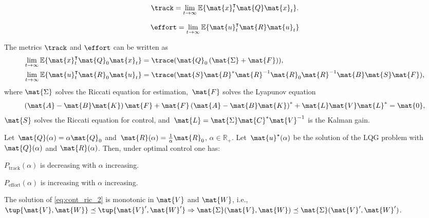 {\begin{forslides}
\begin{equation*}
\label{eq:ptrack}
\track=\lim_{t\to \infty}\mathbb{E}\{\mat{x}_t^\intercal \mat{Q}\mat{x}_t\}.
\end{equation*}

\begin{equation*}
\label{eq:peffort}
\effort=\lim_{t\to \infty}\mathbb{E}\{\mat{u}_t^\intercal \mat{R} \mat{u}_t \}
\end{equation*}


\begin{lemma}
\label{lem:precision}
The metrics $\track$ and $\effort$ can be written as
\begin{equation*}
\begin{aligned}
    \lim_{t\to \infty}\mathbb{E}\{ \mat{x}_t^\intercal \mat{Q}_0\mat{x}_t\}&=\trace(\mat{Q}_0\left( \mat{\Sigma} +\mat{F}\right)), \\
    \lim_{t\to \infty}\mathbb{E}\{ \mat{u}_t^\intercal \mat{R}_0\mat{u}_t\}&=\trace(\mat{S}\mat{B}^*\mat{R}^{-1}\mat{R}_0\mat{R}^{-1}\mat{B}\mat{S}\mat{F}),
\end{aligned}
\end{equation*}
where 
$\mat{\Sigma}$ solves the Riccati equation for estimation,~$\mat{F}$ solves the Lyapunov equation
\begin{equation}
\label{eq:lyapct}
    \left( \mat{A}-\mat{B}\mat{K}\right)\mat{F}+\mat{F}\left(\mat{A}-\mat{B}\mat{K}\right)^*+\mat{L}\mat{V}\mat{L}^*=\mat{0},
\end{equation}
$\mat{S}$ solves the Riccati equation for control, and~$\mat{L}=\mat{\Sigma}\mat{C}^*\mat{V}^{-1}$ is the Kalman gain.
\end{lemma}


\begin{lemma}
\label{lem:codesigncnt_1}
Let~$\mat{Q}(\alpha)=\alpha \mat{Q}_0$ and~$\mat{R}(\alpha)=\frac{1}{\alpha}\mat{R}_0$, $\alpha\in \mathbb{R}_+$. Let~$\mat{u}^\star(\alpha)$ be the solution of the LQG problem with $\mat{Q}(\alpha)$ and $\mat{R}(\alpha)$. Then, under optimal control one has:
\begin{compactitem}
    \item $P_\mathrm{track}(\alpha)$ is decreasing with $\alpha$
    increasing.
    \item $P_\mathrm{effort}(\alpha)$ is increasing with $\alpha$ increasing.
\end{compactitem}
\end{lemma}


\begin{lemma}
\label{lem:cont_V_W}
The solution of  \cref{eq:cont_ric_2} is monotonic in $\mat{V}$ and $\mat{W}$, i.e., $\tup{\mat{V},\mat{W}}\preceq \tup{\mat{V}',\mat{W}'} \Rightarrow \mat{\Sigma}(\mat{V},\mat{W})\preceq \mat{\Sigma}(\mat{V}',\mat{W}')$.
\end{lemma}


\end{forslides}}
